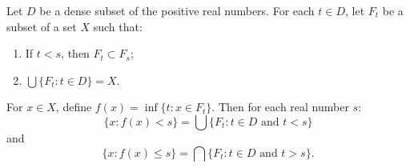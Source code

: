 Let $D$ be a dense subset of the positive real numbers. For each $t \in D$, let $F_t$ be a subset of a set $X$ such that:
\begin{enumerate}
\item[(a)] If $t < s$, then $F_t \subset F_s$;
\item[(b)] $\bigcup \{F_t : t \in D\} = X$.
\end{enumerate}
For $x \in X$, define $f(x) = \inf \{t : x \in F_t\}$. Then for each real number $s$:
$$\{x : f(x) < s\} = \bigcup \{F_t : t \in D \text{ and } t < s\}$$
and
$$\{x : f(x) \leq s\} = \bigcap \{F_t : t \in D \text{ and } t > s\}.$$

